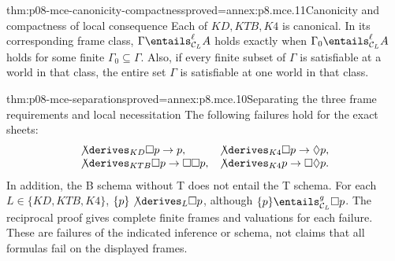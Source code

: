 \begin{hbcorollary}{thm:p08-mce-canonicity-compactness}{proved=annex:p8.mce.11}{Canonicity and compactness of local consequence}
Each of \(KD,KTB,K4\) is canonical. In its corresponding frame class,
\(\Gamma\entails^{\ell}_{\mathcal C_L}A\) holds exactly when
\(\Gamma_0\entails^{\ell}_{\mathcal C_L}A\) holds for some finite
\(\Gamma_0\subseteq\Gamma\). Also, if every finite subset of
\(\Gamma\) is satisfiable at a world in that class, the entire set
\(\Gamma\) is satisfiable at one world in that class.
\end{hbcorollary}

\begin{hblemma}{thm:p08-mce-separations}{proved=annex:p8.mce.10}{Separating the three frame requirements and local necessitation}
The following failures hold for the exact sheets:
\[
\begin{array}{ll}
 \not\derives_{KD} \Box p\to p,
 &\not\derives_{K4} \Box p\to\Diamond p,\\
 \not\derives_{KTB} \Box p\to\Box\Box p,
 &\not\derives_{K4} p\to\Box\Diamond p.
\end{array}
\]
In addition, the B schema without T does not entail the T schema.
For each \(L\in\{KD,KTB,K4\}\),
\(\{p\}\not\derives_L\Box p\), although
\(\{p\}\entails^g_{\mathcal C_L}\Box p\).
The reciprocal proof gives complete finite frames and valuations for each
failure. These are failures of the indicated inference or schema, not
claims that all formulas fail on the displayed frames.
\end{hblemma}
